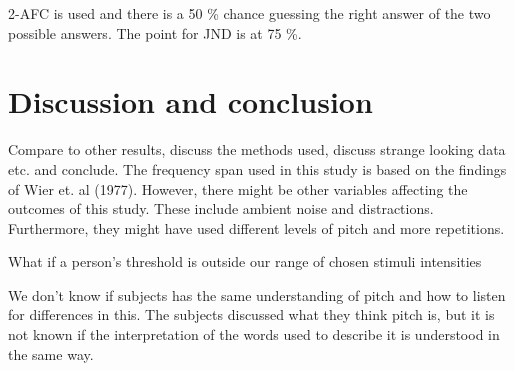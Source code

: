 2-AFC is used and there is a 50 \% chance guessing the right answer of the two possible answers. The point for JND is at 75 \%.

\section*{Discussion and conclusion} 
Compare to other results, discuss the methods used, discuss strange looking data etc. and conclude.
The frequency span used in this study is based on the findings of Wier et. al (1977). However, there might be other variables affecting the outcomes of this study. These include ambient noise and distractions. Furthermore, they might have used different levels of pitch and more repetitions.

What if a person’s threshold is outside our range of chosen stimuli intensities 

We don’t know if subjects has the same understanding of pitch and how to listen for differences in this. The subjects discussed what they think pitch is, but it is not known if the interpretation of the words used to describe it is understood in the same way.





 
